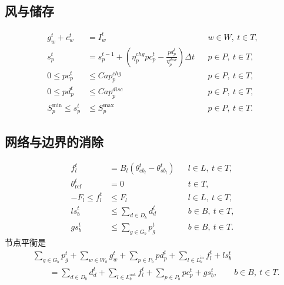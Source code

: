 \documentclass[11pt,a4paper]{article}
\begin{document}
\subsection*{风与储存}
\begin{align}
g_w^t+c_w^t&=I_w^t
&&w\in W,\ t\in T,\\
s_p^t&=s_p^{t-1}+\left(\eta_p^{chg}pc_p^t-\frac{pd_p^t}{\eta_p^{disc}}\right)\Delta t
&&p\in P,\ t\in T,\\
0\leq pc_p^t&\leq Cap_p^{chg}
&&p\in P,\ t\in T,\\
0\leq pd_p^t&\leq Cap_p^{disc}
&&p\in P,\ t\in T,\\
S_p^{\min}\leq s_p^t&\leq S_p^{\max}
&&p\in P,\ t\in T.
\end{align}

\subsection*{网络与边界的消除}
\begin{align}
f_l^t&=B_l\left(\theta_{eb_l}^t-\theta_{sb_l}^t\right)
&&l\in L,\ t\in T,\\
\theta_{\mathrm{ref}}^t&=0
&&t\in T,\\
-F_l\leq f_l^t&\leq F_l
&&l\in L,\ t\in T,\\
ls_b^t&\leq\sum_{d\in D_b}d_d^t
&&b\in B,\ t\in T,\\
gs_b^t&\leq\sum_{g\in G_b}p_g^t
&&b\in B,\ t\in T.
\end{align}
节点平衡是
\begin{equation}
\begin{aligned}
&\sum_{g\in G_b}p_g^t+\sum_{w\in W_b}g_w^t
+\sum_{p\in P_b}pd_p^t+\sum_{l\in L_b^{\mathrm{in}}}f_l^t+ls_b^t\\
&\qquad=\sum_{d\in D_b}d_d^t
+\sum_{l\in L_b^{\mathrm{out}}}f_l^t
+\sum_{p\in P_b}pc_p^t+gs_b^t,
\qquad b\in B,\ t\in T.
\end{aligned}
\end{equation}
\end{document}

